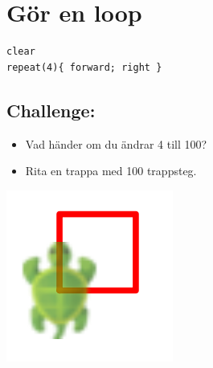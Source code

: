 \chapter{Gör en loop}
\begin{multicols}{2}

\begin{lstlisting}[basicstyle={\ttfamily\fontsize{30}{36}\selectfont},numbers=none]
clear
repeat(4){ forward; right }
\end{lstlisting}
        
\section*{\color{BrickRed}Challenge:}


\begin{itemize}

\item {Vad händer om du ändrar 4 till 100?}
\item {Rita en trappa med 100 trappsteg.}

\end{itemize}



\columnbreak

\begin{center}
\includegraphics{../img/square.png}
\end{center}

\end{multicols}

